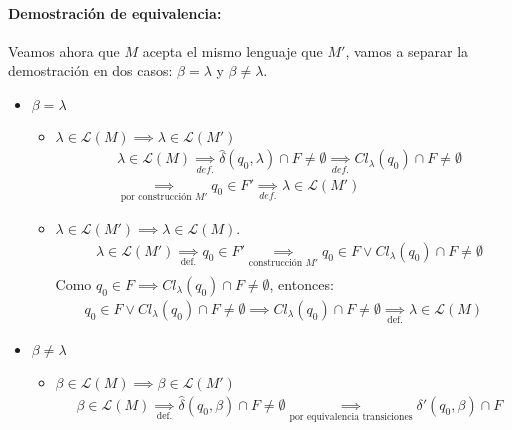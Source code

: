\paragraph{Demostración de equivalencia:} Veamos ahora que \(M\) acepta el mismo lenguaje que \(M'\), vamos a separar la demostración en dos casos: \(\beta=\lambda\) y \(\beta \neq \lambda\).
\begin{itemize}
  \item \(\beta=\lambda\)
        \begin{itemize}
          \item \(\lambda\in\mathcal{L}(M) \implies \lambda\in\mathcal{L}(M')\)
                \begin{align*}
                   & \lambda\in \mathcal{L}(M)  \underset{def.}{\implies} \hat\delta(q_0,\lambda)\cap F \neq \emptyset \underset{def.}{\implies} Cl_{\lambda}(q_0)\cap F \neq \emptyset \\
                   & \underset{\text{por construcción }M'}{\implies} q_0\in F' \underset{def.}{\implies} \lambda\in \mathcal{L}(M')
                \end{align*}
          \item \(\lambda\in\mathcal{L}(M') \implies \lambda\in\mathcal{L}(M)\).
                \begin{align*}
                   & \lambda\in \mathcal{L}(M')  \underset{\text{def.}}{\implies} q_0\in F' \underset{\text{construcción } M'}{\implies} q_0\in F \lor Cl_\lambda(q_0)\cap F \neq\emptyset \\
                \end{align*}
                Como \(q_0\in F \implies Cl_\lambda(q_0)\cap F \neq\emptyset\), entonces:
                \begin{align*}
                  q_0\in F \lor Cl_\lambda(q_0)\cap F \neq\emptyset \implies Cl_\lambda(q_0)\cap F \neq\emptyset \underset{\text{def.}}{\implies} \lambda\in \mathcal{L}(M)
                \end{align*}
        \end{itemize}
  \item \(\beta \neq \lambda\)
        \begin{itemize}
          \item \(\beta\in\mathcal{L}(M) \implies \beta\in\mathcal{L}(M')\)
                \begin{align*}
                   & \beta\in \mathcal{L}(M) \underset{\text{def.}}{\implies} \hat\delta(q_0,\beta)\cap F \neq \emptyset \underset{\text{por equivalencia transiciones}}{\implies} \delta'(q_0,\beta)\cap F \\

\end{align*}
\end{itemize}
\end{itemize}
